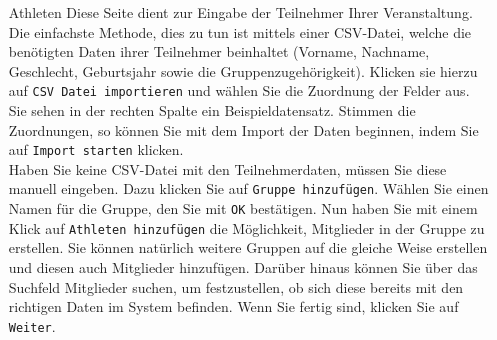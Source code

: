 \documentclass[11pt,a4paper,titlepage,german]{article}
\begin{document}
\begin{enumerate}
\begin{enumerate}
						\item[Athleten] Diese Seite dient zur Eingabe der Teilnehmer Ihrer Veranstaltung. Die einfachste Methode, dies zu tun ist mittels einer CSV-Datei, welche die benötigten Daten ihrer Teilnehmer beinhaltet (Vorname, Nachname, Geschlecht, Geburtsjahr sowie die Gruppenzugehörigkeit). Klicken sie hierzu auf \texttt{CSV Datei importieren} und wählen Sie die Zuordnung der Felder aus. Sie sehen in der rechten Spalte ein Beispieldatensatz. Stimmen die Zuordnungen, so können Sie mit dem Import der Daten beginnen, indem Sie auf \texttt{Import starten} klicken.\\
						Haben Sie keine CSV-Datei mit den Teilnehmerdaten, müssen Sie diese manuell eingeben. Dazu klicken Sie auf \texttt{Gruppe hinzufügen}. Wählen Sie einen Namen für die Gruppe, den Sie mit \texttt{OK} bestätigen. Nun haben Sie mit einem Klick auf \texttt{Athleten hinzufügen} die Möglichkeit, Mitglieder in der Gruppe zu erstellen. Sie können natürlich weitere Gruppen auf die gleiche Weise erstellen und diesen auch Mitglieder hinzufügen. Darüber hinaus können Sie über das Suchfeld Mitglieder suchen, um festzustellen, ob sich diese bereits mit den richtigen Daten im System befinden. Wenn Sie fertig sind, klicken Sie auf \texttt{Weiter}.
						

\end{enumerate}
\end{enumerate}
\end{document}

